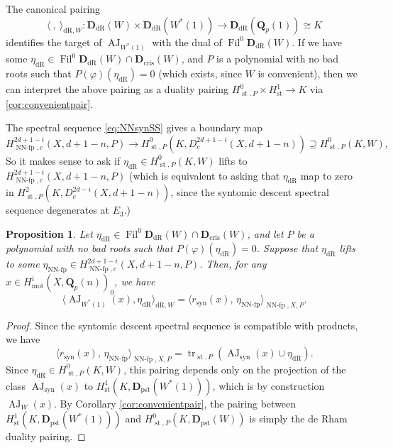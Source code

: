 \documentclass[cjm]{ipart}
\theoremstyle{plain}
\newtheorem{proposition}[theorem]{Proposition}
\theoremstyle{remark}
\DeclareMathOperator{\AJ}{AJ}
\DeclareMathOperator{\Fil}{Fil}
\DeclareMathOperator{\mot}{mot}
\DeclareMathOperator{\NNfp}{NN-fp}
\DeclareMathOperator{\st}{st}
\DeclareMathOperator{\syn}{syn}
\DeclareMathOperator{\tr}{tr}
\newcommand{\Dcris}{\mathbf{D}_{\mathrm{cris}}}
\newcommand{\DdR}{\mathbf{D}_{\mathrm{dR}}}
\newcommand{\Dpst}{\mathbf{D}_{\mathrm{pst}}}
\newcommand{\QQ}{\mathbf{Q}}
\newcommand{\Qp}{\QQ_p}
\newcommand{\dR}{\mathrm{dR}}
\numberwithin{equation}{subsection}
\begin{document}
  The canonical pairing
  \[ \langle\ , \ \rangle_{\dR, W}: \DdR(W) \times \DdR(W^*(1)) \to \DdR(\Qp(1)) \cong K \]
  identifies the target of $\AJ_{W^*(1)}$ with the dual of $\Fil^0 \DdR(W)$. If we have some $\eta_{\dR} \in \Fil^0 \DdR(W) \cap \Dcris(W)$, and $P$ is a polynomial with no bad roots such that $P(\varphi)(\eta_{\dR}) = 0$ (which exists, since $W$ is convenient), then we can interpret the above pairing as a duality pairing $H^0_{\st, P} \times H^1_{\st} \to K$ via \cref{cor:convenientpair}.

  The spectral sequence \eqref{eq:NNsynSS} gives a boundary map
  \[ H^{2d+1-i}_{\NNfp, c}(X, d+1-n, P) \longrightarrow H^0_{\st, P}(K, D^{2d+1-i}_c(X, d+1-n)) \supseteq H^0_{\st, P}(K, W), \]
  So it makes sense to ask if $\eta_{\dR} \in H^0_{\st, P}(K, W)$ lifts to $H^{2d+1-i}_{\NNfp,c}(X,  d+1-n, P)$ (which is equivalent to asking that $\eta_{\dR}$ map to zero in $H^2_{\st, P}(K, D^{2d-i}_c(X, d+1-n))$, since the syntomic descent spectral sequence degenerates at $E_3$.)

  \begin{proposition}
   \label{prop:computeAJwithNN}
   Let $\eta_{\dR} \in \Fil^0 \DdR(W) \cap \Dcris(W)$, and let $P$ be a polynomial with no bad roots such that $P(\varphi)(\eta_{\dR}) = 0$. Suppose that $\eta_{\dR}$ lifts to some $\eta_{\NNfp} \in H^{2d+1-i}_{\NNfp,c}(X,  d+1-n, P)$. Then, for any $x \in H^i_{\mot}(X,\Qp(n))_0$, we have
   \[
    \big\langle \AJ_{W^*(1)}(x) , \eta_{\dR} \big\rangle_{\dR, W} = \big\langle r_{\syn}(x),\, \eta_{\NNfp} \big\rangle_{\NNfp, X, P}.
   \]
  \end{proposition}

  \begin{proof}
   Since the syntomic descent spectral sequence is compatible with products, we have
   \[
    \langle r_{\syn}(x),\, \eta_{\NNfp}\rangle_{\NNfp, X, P}  = \tr_{\st, P}\left( \AJ_{\syn}(x) \cup \eta_{\dR} \right).
   \]
   Since $\eta_{\dR} \in H^0_{\st, P}(K, W)$, this pairing depends only on the projection of the class $\AJ_{\syn}(x)$ to $H^1_{\st}(K, \Dpst(W^*(1)))$, which is by construction $\AJ_W(x)$. By Corollary \ref{cor:convenientpair}, the pairing between $H^1_{\st}(K, \Dpst(W^*(1)))$ and $H^0_{\st, P}(K, \Dpst(W))$ is simply the de Rham duality pairing.
  \end{proof}
\end{document}
